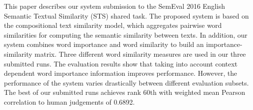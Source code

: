 This paper describes our system submission to the SemEval 2016 English Semantic Textual Similarity (STS) shared task. The proposed system is based on the compositional text similarity model, which aggregates pairwise word similarities for computing the semantic similarity between texts. In addition, our system combines word importance and word similarity to build an importance-similarity matrix. Three different word similarity measures are used in our three submitted runs. The evaluation results show that taking into account context dependent word importance information improves performance. However, the performance of the system varies drastically between different evaluation subsets. The best of our submitted runs achieves rank 60th with weighted mean Pearson correlation to human judgements of 0.6892.
